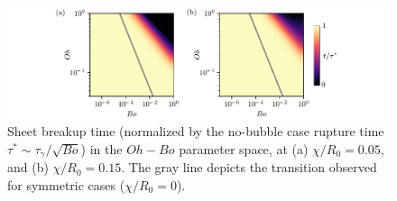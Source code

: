 \documentclass[reprint,amssymb,superscriptaddress,aps,prfluids,onecolumn]{revtex4-2}
\begin{document}
\begin{figure}[h!]
	\includegraphics{OhBo-chi_01.pdf}
	\caption{\label{fig:OhBo-chi}  Sheet breakup time (normalized by the no-bubble case rupture time $\tau^* \sim \tau_\gamma/\sqrt{Bo}$) in the $Oh-Bo$ parameter space, at (a) $\chi/R_0 = 0.05$, and (b) $\chi/R_0 = 0.15$. The gray line depicts the transition observed for symmetric cases ($\chi/R_0 = 0$). 
	}
\end{figure}



\end{document}
